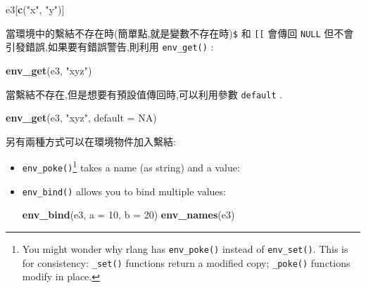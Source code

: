 \documentclass[]{book}
\newenvironment{Shaded}{\begin{snugshade}}{\end{snugshade}}
\newcommand{\DataTypeTok}[1]{\textcolor[rgb]{0.13,0.29,0.53}{#1}}
\newcommand{\DecValTok}[1]{\textcolor[rgb]{0.00,0.00,0.81}{#1}}
\newcommand{\KeywordTok}[1]{\textcolor[rgb]{0.13,0.29,0.53}{\textbf{#1}}}
\newcommand{\NormalTok}[1]{#1}
\newcommand{\OperatorTok}[1]{\textcolor[rgb]{0.81,0.36,0.00}{\textbf{#1}}}
\newcommand{\OtherTok}[1]{\textcolor[rgb]{0.56,0.35,0.01}{#1}}
\newcommand{\StringTok}[1]{\textcolor[rgb]{0.31,0.60,0.02}{#1}}
\let\rmarkdownfootnote\footnote%
\def\footnote{\protect\rmarkdownfootnote}
\theoremstyle{definition}
\theoremstyle{definition}
\theoremstyle{definition}
\theoremstyle{remark}
\begin{document}
\begin{Shaded}
\begin{Highlighting}[]
\NormalTok{e3[}\KeywordTok{c}\NormalTok{(}\StringTok{"x"}\NormalTok{, }\StringTok{"y"}\NormalTok{)]}
\end{Highlighting}
\end{Shaded}

當環境中的繫結不存在時(簡單點,就是變數不存在時)\texttt{\$} 和
\texttt{{[}{[}} 會傳回 \texttt{NULL}
但不會引發錯誤,如果要有錯誤警告,則利用 \texttt{env\_get()} :

\begin{Shaded}
\end{Shaded}

\begin{Shaded}
\begin{Highlighting}[]
\KeywordTok{env_get}\NormalTok{(e3, }\StringTok{"xyz"}\NormalTok{)}
\end{Highlighting}
\end{Shaded}

當繫結不存在,但是想要有預設值傳回時,可以利用參數 \texttt{default} .

\begin{Shaded}
\begin{Highlighting}[]
\KeywordTok{env_get}\NormalTok{(e3, }\StringTok{"xyz"}\NormalTok{, }\DataTypeTok{default =} \OtherTok{NA}\NormalTok{)}
\end{Highlighting}
\end{Shaded}

另有兩種方式可以在環境物件加入繫結:

\begin{itemize}
\item
  \texttt{env\_poke()}\footnote{You might wonder why rlang has
    \texttt{env\_poke()} instead of \texttt{env\_set()}. This is for
    consistency: \texttt{\_set()} functions return a modified copy;
    \texttt{\_poke()} functions modify in place.} takes a name (as
  string) and a value:

\begin{Shaded}
\end{Shaded}
\item
  \texttt{env\_bind()} allows you to bind multiple values:

\begin{Shaded}
\begin{Highlighting}[]
\KeywordTok{env_bind}\NormalTok{(e3, }\DataTypeTok{a =} \DecValTok{10}\NormalTok{, }\DataTypeTok{b =} \DecValTok{20}\NormalTok{)}
\KeywordTok{env_names}\NormalTok{(e3)}
\end{Highlighting}
\end{Shaded}
\end{itemize}
\end{document}
